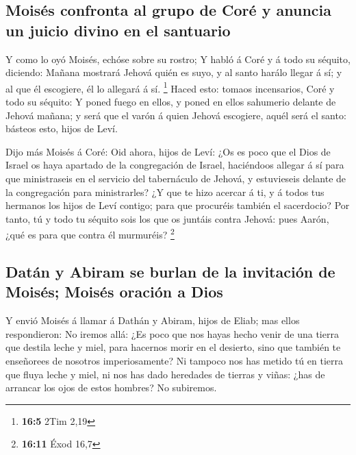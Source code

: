 \hypertarget{moisuxe9s-confronta-al-grupo-de-coruxe9-y-anuncia-un-juicio-divino-en-el-santuario}{%
\subsection{Moisés confronta al grupo de Coré y anuncia un juicio divino
en el
santuario}\label{moisuxe9s-confronta-al-grupo-de-coruxe9-y-anuncia-un-juicio-divino-en-el-santuario}}

 Y como lo oyó Moisés, echóse sobre su rostro;
 Y habló á Coré y á todo su séquito, diciendo: Mañana
mostrará Jehová quién es suyo, y al santo harálo llegar á sí; y al que
él escogiere, él lo allegará á sí. \footnote{\textbf{16:5} 2Tim 2,19}
 Haced esto: tomaos incensarios, Coré y todo su séquito:
 Y poned fuego en ellos, y poned en ellos sahumerio
delante de Jehová mañana; y será que el varón á quien Jehová escogiere,
aquél será el santo: básteos esto, hijos de Leví.

 Dijo más Moisés á Coré: Oid ahora, hijos de Leví:
 ¿Os es poco que el Dios de Israel os haya apartado de la
congregación de Israel, haciéndoos allegar á sí para que ministraseis en
el servicio del tabernáculo de Jehová, y estuvieseis delante de la
congregación para ministrarles?  ¿Y que te hizo acercar á
ti, y á todos tus hermanos los hijos de Leví contigo; para que procuréis
también el sacerdocio?  Por tanto, tú y todo tu séquito
sois los que os juntáis contra Jehová: pues Aarón, ¿qué es para que
contra él murmuréis? \footnote{\textbf{16:11} Éxod 16,7}

\hypertarget{datuxe1n-y-abiram-se-burlan-de-la-invitaciuxf3n-de-moisuxe9s-moisuxe9s-oraciuxf3n-a-dios}{%
\subsection{Datán y Abiram se burlan de la invitación de Moisés; Moisés
oración a
Dios}\label{datuxe1n-y-abiram-se-burlan-de-la-invitaciuxf3n-de-moisuxe9s-moisuxe9s-oraciuxf3n-a-dios}}

 Y envió Moisés á llamar á Dathán y Abiram, hijos de
Eliab; mas ellos respondieron: No iremos allá:  ¿Es poco
que nos hayas hecho venir de una tierra que destila leche y miel, para
hacernos morir en el desierto, sino que también te enseñorees de
nosotros imperiosamente?  Ni tampoco nos has metido tú en
tierra que fluya leche y miel, ni nos has dado heredades de tierras y
viñas: ¿has de arrancar los ojos de estos hombres? No subiremos.

